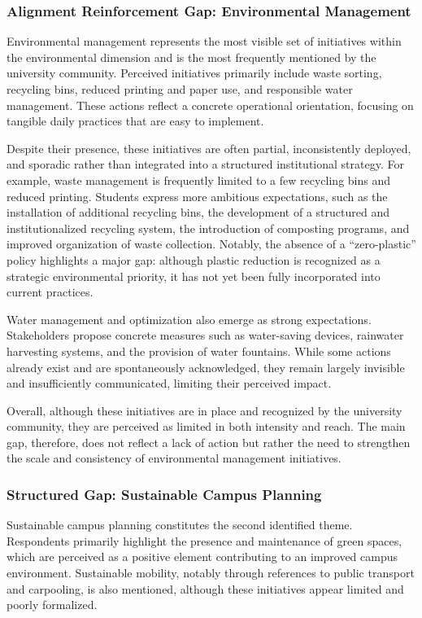 \documentclass[12pt,a4paper]{article}
\begin{document}
\subsubsection{Alignment Reinforcement Gap: Environmental Management}

Environmental management represents the most visible set of initiatives within the environmental dimension and is the most frequently mentioned by the university community. Perceived initiatives primarily include waste sorting, recycling bins, reduced printing and paper use, and responsible water management. These actions reflect a concrete operational orientation, focusing on tangible daily practices that are easy to implement.

Despite their presence, these initiatives are often partial, inconsistently deployed, and sporadic rather than integrated into a structured institutional strategy. For example, waste management is frequently limited to a few recycling bins and reduced printing. Students express more ambitious expectations, such as the installation of additional recycling bins, the development of a structured and institutionalized recycling system, the introduction of composting programs, and improved organization of waste collection. Notably, the absence of a ``zero-plastic'' policy highlights a major gap: although plastic reduction is recognized as a strategic environmental priority, it has not yet been fully incorporated into current practices.

Water management and optimization also emerge as strong expectations. Stakeholders propose concrete measures such as water-saving devices, rainwater harvesting systems, and the provision of water fountains. While some actions already exist and are spontaneously acknowledged, they remain largely invisible and insufficiently communicated, limiting their perceived impact.

Overall, although these initiatives are in place and recognized by the university community, they are perceived as limited in both intensity and reach. The main gap, therefore, does not reflect a lack of action but rather the need to strengthen the scale and consistency of environmental management initiatives.

\subsubsection{Structured Gap: Sustainable Campus Planning}

Sustainable campus planning constitutes the second identified theme. Respondents primarily highlight the presence and maintenance of green spaces, which are perceived as a positive element contributing to an improved campus environment. Sustainable mobility, notably through references to public transport and carpooling, is also mentioned, although these initiatives appear limited and poorly formalized.
\end{document}

